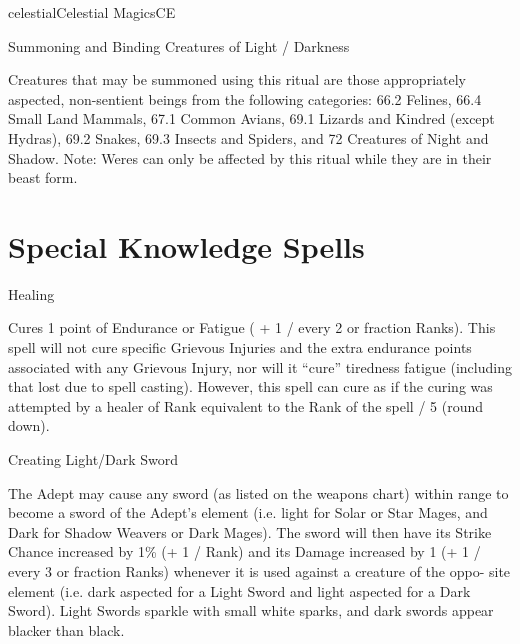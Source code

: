 \begin{College}[1.3]{celestial}{Celestial Magics}{CE}
\begin{ritual}[Q-2]{Summoning and Binding Creatures of Light / Darkness}
\begin{effects}
Creatures that may be summoned using this ritual are those
appropriately aspected, non-sentient beings from the following
categories: 66.2 Felines, 66.4 Small Land Mammals, 67.1 Common Avians,
69.1 Lizards and Kindred (except Hydras), 69.2 Snakes, 69.3 Insects
and Spiders, and 72 Creatures of Night and Shadow.  Note: Weres can
only be affected by this ritual while they are in their beast form.
\end{effects}
\end{ritual}


\section{Special Knowledge Spells}

\begin{spell}[S-1]{Healing}

\begin{effects}
Cures 1 point of Endurance or Fatigue ( + 1 / every 2 or fraction
Ranks).  This spell will not cure specific Grievous Injuries and the
extra endurance points associated with any Grievous Injury, nor will
it “cure” tiredness fatigue (including that lost due to spell
casting).  However, this spell can cure as if the curing was attempted
by a healer of Rank equivalent to the Rank of the spell / 5 (round
down).
\end{effects}
\end{spell}

\begin{spell}[S-2]{Creating Light/Dark Sword}
\begin{effects}
The Adept may cause any sword (as listed on the weapons chart) within
range to become a sword of the Adept’s element (i.e. light for Solar
or Star Mages, and Dark for Shadow Weavers or Dark Mages).  The sword
will then have its Strike Chance increased by 1\% (+ 1 / Rank) and its
Damage increased by 1 (+ 1 / every 3 or fraction Ranks) whenever it is
used against a creature of the oppo- site element (i.e. dark aspected
for a Light Sword and light aspected for a Dark Sword).  Light Swords
sparkle with small white sparks, and dark swords appear blacker than
black.
\end{effects}
\end{spell}


\end{College}
